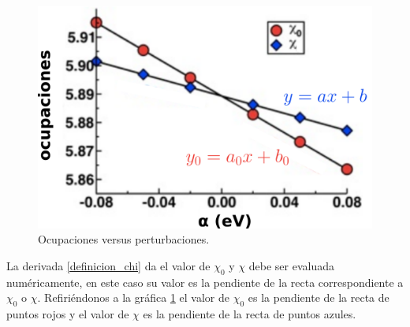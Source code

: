\begin{figure}[H]
    \centering
    \includegraphics[width=0.6\linewidth]{contenido/calculos_computacionales/calculo_hubbard/img_lineal/RespuestaLineal}
    \caption{Ocupaciones versus perturbaciones.}
    \label{RespuestaLineal}
\end{figure}

\noindent La derivada \ref{definicion_chi} da el valor de $\chi_{0}$ y $\chi$ debe ser evaluada num\'ericamente, en este caso su valor es la pendiente de la recta correspondiente a $\chi_{0}$ o $\chi$. Refiri\'endonos  a la gr\'afica \ref{RespuestaLineal} el valor de $\chi_{0}$ es la pendiente de la recta de puntos rojos y el valor de $\chi$ es la pendiente de la recta de puntos azules.